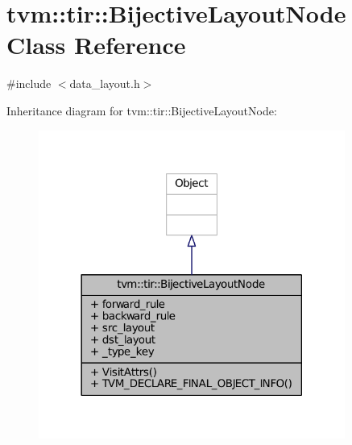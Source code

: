 \hypertarget{classtvm_1_1tir_1_1BijectiveLayoutNode}{}\section{tvm\+:\+:tir\+:\+:Bijective\+Layout\+Node Class Reference}
\label{classtvm_1_1tir_1_1BijectiveLayoutNode}


{\ttfamily \#include $<$data\+\_\+layout.\+h$>$}



Inheritance diagram for tvm\+:\+:tir\+:\+:Bijective\+Layout\+Node\+:
\nopagebreak
\begin{figure}[H]
\begin{center}
\leavevmode
\includegraphics[width=285pt]{classtvm_1_1tir_1_1BijectiveLayoutNode__inherit__graph}
\end{center}
\end{figure}


